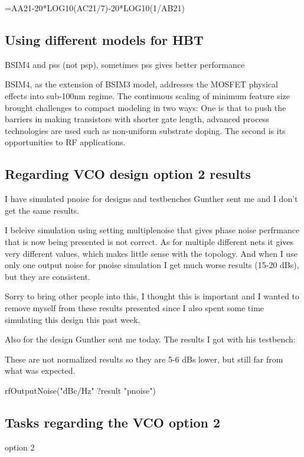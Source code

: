 \documentclass{article}
\begin{document}
=AA21-20*LOG10(AC21/7)-20*LOG10(1/AB21)

\subsection{Using different models for HBT}

BSIM4 and pss (not psp), sometimes pss gives better performance

BSIM4, as the extension of BSIM3 model, addresses the MOSFET physical effects into sub-100nm regime. The continuous scaling of minimum feature size brought challenges to compact modeling in two ways: One is that to push the barriers in making transistors with shorter gate length, advanced process technologies are used such as non-uniform substrate doping. The second is its opportunities to RF applications.


\subsection{Regarding VCO design option 2 results}

I have simulated pnoise for designs and testbenches Gunther sent me and I don't get the same results.

I beleive simulation using setting multiplenoise that gives phase noise perfrmance that is now being presented is not correct.
As for multiple different nets it gives very different values, which makes little sense with the topology.
And when I use only one output noise for pnoise simulation I get much worse results (15-20 dBs), but they are consistent.

Sorry to bring other people into this, I thought this is important and I wanted to remove myself from these results presented since I also spent some time simulating this design this past week.

Also for the design Gunther sent me today. The results I got with his testbench:

These are not normalized results so they are 5-6 dBs lower, but still far from what was expected.

rfOutputNoise("dBc/Hz" ?result "pnoise")


\subsection{Tasks regarding the VCO option 2}

option 2
\end{document}
